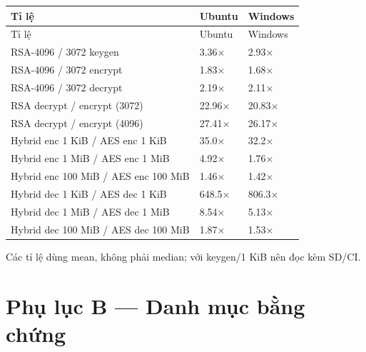 \documentclass[12pt,a4paper,oneside]{report}
\begin{document}
\begin{longtable}{p{}p{}p{}}
\toprule
Tỉ lệ & Ubuntu & Windows \\
\midrule
\endfirsthead
\toprule
Tỉ lệ & Ubuntu & Windows \\
\midrule
\endhead
RSA-4096 / 3072 keygen & 3.36× & 2.93× \\
RSA-4096 / 3072 encrypt & 1.83× & 1.68× \\
RSA-4096 / 3072 decrypt & 2.19× & 2.11× \\
RSA decrypt / encrypt (3072) & 22.96× & 20.83× \\
RSA decrypt / encrypt (4096) & 27.41× & 26.17× \\
Hybrid enc 1 KiB / AES enc 1 KiB & 35.0× & 32.2× \\
Hybrid enc 1 MiB / AES enc 1 MiB & 4.92× & 1.76× \\
Hybrid enc 100 MiB / AES enc 100 MiB & 1.46× & 1.42× \\
Hybrid dec 1 KiB / AES dec 1 KiB & 648.5× & 806.3× \\
Hybrid dec 1 MiB / AES dec 1 MiB & 8.54× & 5.13× \\
Hybrid dec 100 MiB / AES dec 100 MiB & 1.87× & 1.53× \\
\bottomrule
\end{longtable}


Các tỉ lệ dùng mean, không phải median; với keygen/1 KiB nên đọc kèm SD/CI.


\section{Phụ lục B — Danh mục bằng chứng}
\end{document}
